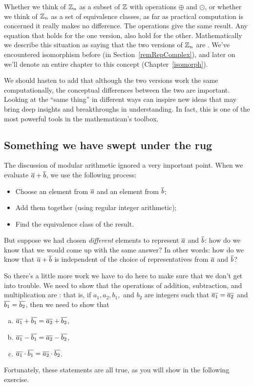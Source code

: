 Whether we think of $\mathbb{Z}_n$ as a subset of $\mathbb{Z}$ with operations $\oplus$ and $\odot$, or whether we think of $\mathbb{Z}_n$ as a set of equivalence classes, as far as practical computation is concerned it really makes no difference. The operations give the same result. Any equation that holds for the one version, also hold for the other. Mathematically we describe this situation as saying that the two versions of $\mathbb{Z}_n$ are . We've encountered isomorphism before (in Section~\ref{remRepComplex}), and later on we'll denote an entire chapter to this concept (Chapter~\ref{isomorph}).

We should hasten to add that although the two versions work the same computationally, the conceptual differences between the two are important. Looking at the ``same thing'' in different ways can inspire new ideas that may bring deep insights and breakthroughs in understanding.  In fact, this is one of the most powerful tools in the mathematican's toolbox. 

\subsection{Something we have swept under the rug} \label{EquivalenceRelationsWellDefSect}

The discussion of modular arithmetic ignored a very important point. When we evaluate $\overline{a} \mathbin{+} \overline{b}$, we use the following process:
\begin{itemize}
\item
Choose an element from  $\overline{a}$ and an element from $\overline{b}$;
\item
Add them together (using regular integer arithmetic);
\item
Find the equivalence class of the result. 
\end{itemize}

But suppose we had chosen \emph{different} elements to represent $\overline{a}$ and $\overline{b}$: how do we know that we would come up with the same answer? In other words: how do we know that $\overline{a} \mathbin{+} \overline{b}$ is independent of the choice of representatives from $\overline{a}$ and $\overline{b}$?

So there's a little more work we have to do here to make sure that we don't get into trouble. We need to show that  the operations of addition, subtraction, and multiplication are : that is, if $a_1, a_2, b_1,$ and $b_2$ are integers such that  $\overline{a_1} = \overline{a_2}$ and $\overline{b_1} = \overline{b_2}$, then we need to show that
\begin{enumerate}[(a)]
\item $\overline{a_1} \mathbin{+} \overline{b_1} = \overline{a_2} \mathbin{+} \overline{b_2}$,
\item $\overline{a_1} \mathbin{-} \overline{b_1} = \overline{a_2} \mathbin{-} \overline{b_2}$, 
\item $\overline{a_1} \cdot \overline{b_1} = \overline{a_2} \cdot \overline{b_2}$.
\end{enumerate}
Fortunately, these statements are all true, as you will show in the following exercise.

